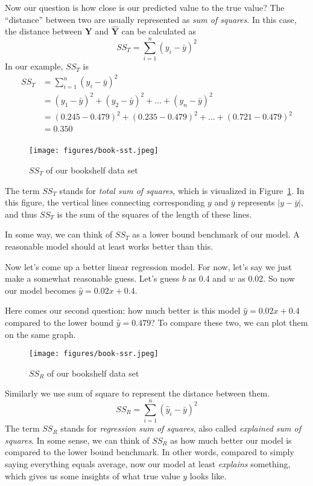 \documentclass[
	letterpaper
]{article}
\begin{document}
Now our question is how close is our predicted value to the true value?
The ``distance'' between two are usually represented as \textit{sum of squares}.
In this case, the distance between $\mathbf{Y}$ and $\mathbf{\hat Y}$ can be calculated as
\begin{equation}
SS_T = \sum_{i = 1}^n (y_i - \bar y) ^2 
\end{equation}
In our example, $SS_T$ is 
\begin{equation}
\begin{split}
SS_T &= \sum_{i = 1}^n (y_i - \bar y) ^2 \\
& = (y_1 - \bar y) ^2 + (y_2 - \bar y) ^2 + ... + (y_n - \bar y) ^2\\
& = (0.245 - 0.479) ^2 + (0.235 - 0.479) ^2 + ... + (0.721 - 0.479) ^2\\
& = 0.350\\
\end{split}
\end{equation}

\begin{figure}[htbp]
	\centering
	\texttt{[image: figures/book-sst.jpeg]}
	\caption{$SS_T$ of our bookshelf data set}
	\label{fig:book-sst}
\end{figure}

The term $SS_T$ stands for \textit{total sum of squares}, which is visualized in Figure~\ref{fig:book-sst}.
In this figure, the vertical lines connecting corresponding $y$ and $\bar y$ represents $|y - \bar y|$, and thus $SS_T$ is the sum of the squares of the length of these lines.

In some way, we can think of $SS_T$ as a lower bound benchmark of our model.
A reasonable model should at least works better than this.

Now let's come up a better linear regression model.
For now, let's say we just make a somewhat reasonable guess.
Let's guess $b$ as 0.4 and $w$ as 0.02.
So now our model becomes ${\hat y} = 0.02 x + 0.4$.

Here comes our second question: how much better is this model ${\hat y} = 0.02 x + 0.4$ compared to the lower bound ${\hat y} = 0.479$?
To compare these two, we can plot them on the same graph.
\begin{figure}[htbp]
	\centering
	\texttt{[image: figures/book-ssr.jpeg]}
	\caption{$SS_R$ of our bookshelf data set}
	\label{fig:book-ssr}
\end{figure}

Similarly we use sum of square to represent the distance between them.
\begin{equation}
SS_R= \sum_{i = 1}^n (\hat y_i - \bar y) ^2 
\end{equation}
The term $SS_R$ stands for \textit{regression sum of squares}, also called \textit{explained sum of squares}.
In some sense, we can think of $SS_R$ as how much better our model is compared to the lower bound benchmark.
In other words, compared to simply saying everything equals average, now our model at least \textit{explains} something, which gives us some insights of what true value $y$ looks like.
\end{document}
